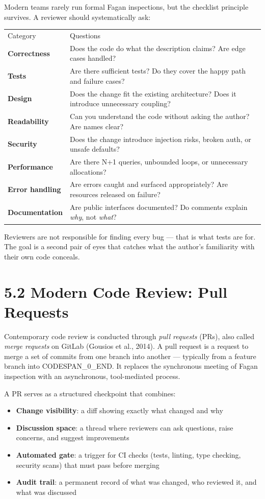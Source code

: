 \documentclass[11pt,a4paper]{book}
\begin{document}
Modern teams rarely run formal Fagan inspections, but the checklist principle survives. A reviewer should systematically ask:

\begin{tabular}{ll}
\hline
Category & Questions \\
\textbf{Correctness} & Does the code do what the description claims? Are edge cases handled? \\
\textbf{Tests} & Are there sufficient tests? Do they cover the happy path and failure cases? \\
\textbf{Design} & Does the change fit the existing architecture? Does it introduce unnecessary coupling? \\
\textbf{Readability} & Can you understand the code without asking the author? Are names clear? \\
\textbf{Security} & Does the change introduce injection risks, broken auth, or unsafe defaults? \\
\textbf{Performance} & Are there N+1 queries, unbounded loops, or unnecessary allocations? \\
\textbf{Error handling} & Are errors caught and surfaced appropriately? Are resources released on failure? \\
\textbf{Documentation} & Are public interfaces documented? Do comments explain \textit{why}, not \textit{what}? \\
\hline
\end{tabular}

Reviewers are not responsible for finding every bug --- that is what tests are for. The goal is a second pair of eyes that catches what the author's familiarity with their own code conceals.

\medskip

\section{5.2 Modern Code Review: Pull Requests}

Contemporary code review is conducted through \textit{pull requests} (PRs), also called \textit{merge requests} on GitLab (Gousios et al., 2014). A pull request is a request to merge a set of commits from one branch into another --- typically from a feature branch into CODESPAN\_0\_END. It replaces the synchronous meeting of Fagan inspection with an asynchronous, tool-mediated process.

A PR serves as a structured checkpoint that combines:

\begin{itemize}
  \item \textbf{Change visibility}: a diff showing exactly what changed and why
  \item \textbf{Discussion space}: a thread where reviewers can ask questions, raise concerns, and suggest improvements
  \item \textbf{Automated gate}: a trigger for CI checks (tests, linting, type checking, security scans) that must pass before merging
  \item \textbf{Audit trail}: a permanent record of what was changed, who reviewed it, and what was discussed
\end{itemize}
\end{document}
